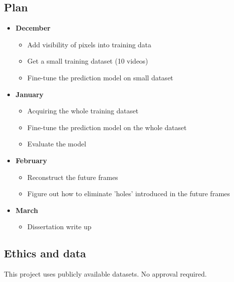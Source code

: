 \documentclass[11pt]{article}
\begin{document}
\subsection{Plan}\label{plan}
\begin{itemize}
\itemsep0em
    \item \textbf{December}
            \begin{itemize}
                \itemsep0em
                \item Add visibility of pixels into training data
                \item Get a small training dataset (10 videos)
                \item Fine-tune the prediction model on small dataset
            \end{itemize}
    \item \textbf{January}
            \begin{itemize}
                \itemsep0em
                \item Acquiring the whole training dataset
                \item Fine-tune the prediction model on the whole dataset
                \item Evaluate the model
            \end{itemize}
    \item \textbf{February}
            \begin{itemize}
              \itemsep0em
              \item Reconstruct the future frames
              \item Figure out how to eliminate 'holes' introduced in the future frames
            \end{itemize}
    \item \textbf{March}
            \begin{itemize}
                \itemsep0em
                \item Dissertation write up
            \end{itemize}
\end{itemize}

\subsection{Ethics and data}\label{ethics}
This project uses publicly available datasets. No approval required.
\end{document}
